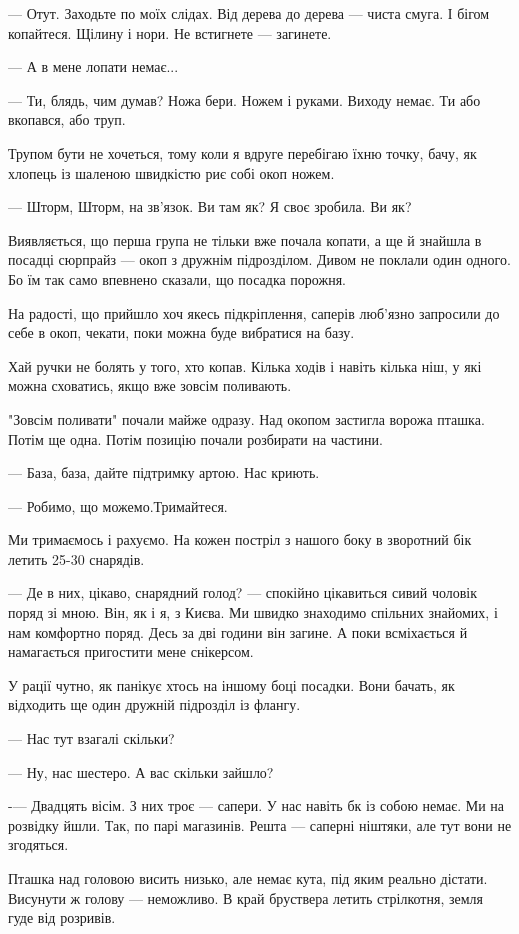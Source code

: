 — Отут. Заходьте по моїх слідах. Від дерева до дерева — чиста смуга. І бігом
копайтеся. Щілину і нори. Не встигнете  — загинете. 

— А в мене лопати немає...

— Ти, блядь, чим думав? Ножа бери. Ножем і руками. Виходу немає. Ти або
вкопався, або труп. 

Трупом бути не хочеться, тому коли я вдруге перебігаю їхню точку, бачу, як
хлопець із шаленою швидкістю риє собі окоп ножем. 

— Шторм, Шторм, на зв'язок. Ви там як? Я своє зробила. Ви як? 

Виявляється,  що перша група не тільки вже почала копати, а ще й знайшла в
посадці сюрпрайз — окоп з дружнім підрозділом.  Дивом не поклали один одного.
Бо їм так само впевнено сказали, що посадка порожня. 

На радості, що прийшло хоч якесь підкріплення, саперів люб'язно запросили до
себе в окоп, чекати, поки можна буде вибратися на базу. 

Хай ручки не болять у того, хто  копав. Кілька ходів і навіть кілька ніш, у які
можна сховатись, якщо вже зовсім поливають. 

"Зовсім поливати" почали майже одразу.  Над окопом застигла ворожа пташка.
Потім ще одна. Потім позицію почали розбирати на частини.

— База, база, дайте підтримку артою. Нас криють.

— Робимо, що можемо.Тримайтеся. 

Ми тримаємось і рахуємо. На кожен постріл з нашого боку в зворотний бік летить
25-30 снарядів.  

— Де в них, цікаво, снарядний голод? — спокійно цікавиться сивий чоловік поряд
зі мною. Він, як і я, з Києва. Ми швидко знаходимо спільних знайомих, і нам
комфортно поряд. Десь за дві години він загине. А поки всміхається й
намагається пригостити мене снікерсом. 

У рації чутно, як панікує хтось на іншому боці посадки. Вони бачать, як
відходить ще один дружній підрозділ із флангу. 

— Нас тут взагалі скільки? 

— Ну, нас шестеро. А вас скільки зайшло? 

-— Двадцять вісім. З них троє  —   сапери.  У нас навіть бк із собою немає. Ми
на розвідку йшли. Так, по парі магазинів. Решта — саперні ніштяки, але тут вони
не згодяться. 

Пташка над головою висить низько,  але немає кута, під яким реально дістати.
Висунути ж голову  —   неможливо. В край бруствера летить стрілкотня, земля
гуде від розривів. 


